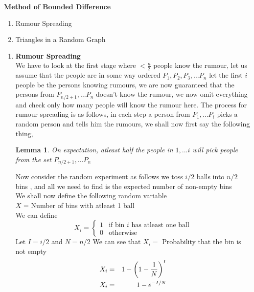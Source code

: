\documentclass{assignment}
\date{November 14, 2011}
\newtheorem{lemma}{Lemma}
\begin{document}
\begin{problemlist}
\pbitem
\begin{problem}
 \textbf{Method of Bounded Difference}
\begin{enumerate}
 \item Rumour Spreading
 \item Triangles in a Random Graph 
\end{enumerate}
 
\begin{answer}
\begin{enumerate}
 \item \textbf{Rumour Spreading} \\
We have to look at the first stage where $< \frac{n}{2}$ people know the rumour, let us assume that the people are in some way ordered $P_1,P_2,P_3,\ldots P_n$ let the first $i$ people be the persons knowing rumours, we are now guaranteed that the persons from $P_{n/2+1},\ldots P_n$ doesn't know the rumour, we now omit everything and check only how many people will know the rumour here. The process for rumour spreading is as follows, in each step a person from $P_1, \ldots P_i$ picks a random person and tells him the rumours, we shall now first say the following thing,\\
\begin{lemma}
On expectation, atleast half the people in $1,...i$ will pick people from the set  $P_{n/2+1},\ldots P_n$
\end{lemma}
Now consider the random experiment as follows we toss $i/2$ balls into $n/2$ bins , and all we need to find is the expected number of non-empty bins \\
We shall now define the following random variable \\
$X$ = Number of bins with atleast 1 ball \\
We can define 
\[
 X_i =  
\begin{cases}
 1 & \text{if bin $i$ has atleast one ball}\\
 0 & \text{otherwise}
\end{cases}
\]
Let $I=i/2$ and $N=n/2$
We can see that $X_i= $ Probability that the bin is not empty
\begin{eqnarray}
 X_i&=& 1- \left( 1- {1 \over N} \right)^I \\
 X_i&=& 1- e^{-I/N} 
\end{eqnarray}


\end{enumerate}
\end{answer}
\end{problem}
\end{problemlist}
\end{document}

